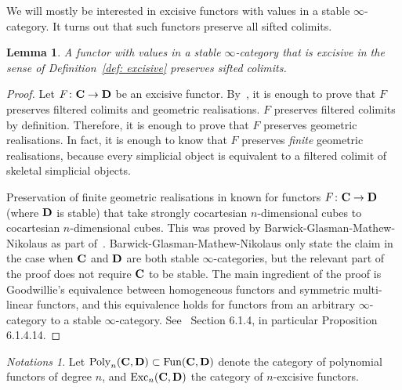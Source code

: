 \documentclass[psamsfonts]{amsart}
\theoremstyle{plain}
\newtheorem{lem}[thm]{Lemma}
\theoremstyle{definition}
\theoremstyle{remark}
\newtheorem{notns}[thm]{Notations}
\newcommand{\catname}[1]{{\normalfont\textbf{#1}}}
\DeclareMathOperator{\fun}{Fun}
\DeclareMathOperator{\poly}{Poly}
\DeclareMathOperator{\exc}{Exc}
\begin{document}
We will mostly be interested in excisive functors with values in a stable $\infty$-category. It turns out that such functors preserve all sifted colimits.
\begin{lem}\label{lemma:preserve sifted}
A functor with values in a stable $\infty$-category that is excisive in the sense of Definition~\ref{def: excisive} preserves sifted colimits.
\end{lem}
\begin{proof}
Let $F\colon \catname{C}\to \catname{D}$ be an excisive functor. By~\cite[Corollary 5.5.8.17]{LurieHTT}, it is enough to prove that $F$ preserves filtered colimits and geometric realisations. $F$ preserves filtered colimits by definition. Therefore, it is enough to prove that $F$ preserves geometric realisations. In fact, it is enough to know that $F$ preserves \emph{finite} geometric realisations, because every simplicial object is equivalent to a filtered colimit of skeletal simplicial objects. 

Preservation of finite geometric realisations in known for functors $F\colon \catname{C}\to \catname{D}$ (where $\catname{D}$ is stable) that take strongly cocartesian $n$-dimensional cubes to cocartesian $n$-dimensional cubes. This was proved by Barwick-Glasman-Mathew-Nikolaus as part of~\cite[Proposition 2.15]{Barwick-Glasman-Mathew-Nikolaus}. Barwick-Glasman-Mathew-Nikolaus only state the claim in the case when $\catname{C}$ and $\catname{D}$ are both stable $\infty$-categories, but the relevant part of the proof does not require $\catname{C}$ to be stable. The main ingredient of the proof is Goodwillie's equivalence between homogeneous functors and symmetric multi-linear functors, and this equivalence holds for functors from an arbitrary $\infty$-category to a stable $\infty$-category. See~\cite{LurieHA} Section 6.1.4, in particular Proposition 6.1.4.14.
\end{proof}
\begin{notns}
Let $\poly_n(\catname{C}, \catname{D})\subset \fun(\catname{C}, \catname{D})$ denote the category of polynomial functors of degree $n$, and $\exc_n(\catname{C}, \catname{D})$ the category of $n$-excisive functors. 
\end{notns}
\end{document}
